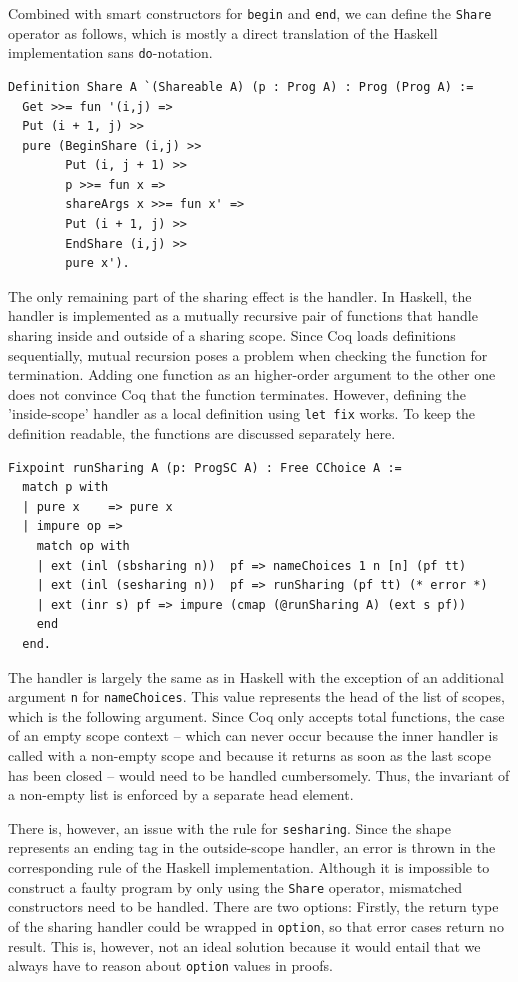 \documentclass[a4paper, 11pt, fleqn, twoside, abstract=on]{scrreprt}
\newcommand{\hinl}[1]{\texttt{#1}}
\newcommand{\cinl}[1]{\texttt{#1}}
\begin{document}
Combined with smart constructors for \cinl{begin} and \cinl{end}, we can define the \cinl{Share} operator as follows, which is mostly a direct translation of the Haskell implementation sans \hinl{do}-notation.

\begin{verbatim}
Definition Share A `(Shareable A) (p : Prog A) : Prog (Prog A) :=
  Get >>= fun '(i,j) =>
  Put (i + 1, j) >>
  pure (BeginShare (i,j) >>
        Put (i, j + 1) >>
        p >>= fun x =>
        shareArgs x >>= fun x' =>
        Put (i + 1, j) >>
        EndShare (i,j) >>
        pure x').
\end{verbatim}

The only remaining part of the sharing effect is the handler.
In Haskell, the handler is implemented as a mutually recursive pair of functions that handle sharing inside and outside of a sharing scope.
Since Coq loads definitions sequentially, mutual recursion poses a problem when checking the function for termination.
Adding one function as an higher-order argument to the other one does not convince Coq that the function terminates.
However, defining the 'inside-scope' handler as a local definition using \cinl{let fix} works.
To keep the definition readable, the functions are discussed separately here.

\begin{verbatim}
Fixpoint runSharing A (p: ProgSC A) : Free CChoice A :=
  match p with
  | pure x    => pure x
  | impure op =>
    match op with
    | ext (inl (sbsharing n))  pf => nameChoices 1 n [n] (pf tt)
    | ext (inl (sesharing n))  pf => runSharing (pf tt) (* error *)
    | ext (inr s) pf => impure (cmap (@runSharing A) (ext s pf))
    end
  end.
\end{verbatim}

The handler is largely the same as in Haskell with the exception of an additional argument \cinl{n} for \cinl{nameChoices}.
This value represents the head of the list of scopes, which is the following argument.
Since Coq only accepts total functions, the case of an empty scope context -- which can never occur because the inner handler is called with a non-empty scope and because it returns as soon as the last scope has been closed -- would need to be handled cumbersomely.
Thus, the invariant of a non-empty list is enforced by a separate head element.

There is, however, an issue with the rule for \cinl{sesharing}.
Since the shape represents an ending tag in the outside-scope handler, an error is thrown in the corresponding rule of the Haskell implementation.
Although it is impossible to construct a faulty program by only using the \cinl{Share} operator, mismatched constructors need to be handled.
There are two options: Firstly, the return type of the sharing handler could be wrapped in \cinl{option}, so that error cases return no result.
This is, however, not an ideal solution because it would entail that we always have to reason about \cinl{option} values in proofs.
\end{document}
